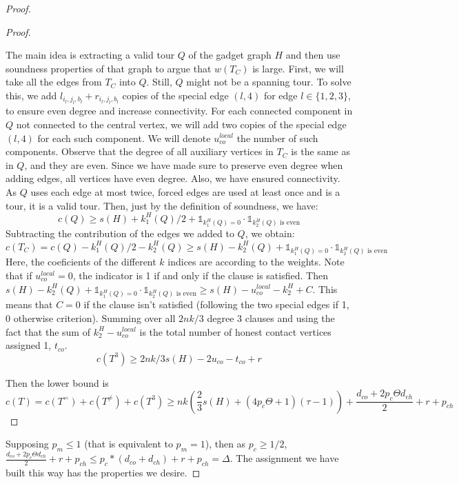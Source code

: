 \documentclass[12pt]{article}
\begin{document}
\begin{proof}
\begin{proof}
\begin{itemize}
        The main idea is extracting a valid tour $Q$ of the gadget graph $H$ and then use soundness properties of that graph to argue that $w(T_C)$ is large. 
        First, we will take all the edges from $T_C$ into $Q$. Still, $Q$ might not be a spanning tour.
        To solve this, we add $l_{i_l,j_l,b_l}+r_{i_l,j_l,b_l}$ copies of the special edge $(l,4)$ for edge $l\in \{1,2,3\}$, to ensure even degree and increase connectivity. For each connected component in $Q$ not connected to the central vertex, we will add two copies of the special edge $(l,4)$ for each such component.
        We will denote $u_{co}^{local}$ the number of such components.
        Observe that the degree of all auxiliary vertices in $T_C$ is the same as in $Q$, and they are even. Since we have made sure to preserve even degree when adding edges, all vertices have even degree. 
        Also, we have ensured connectivity. As $Q$ uses each edge at most twice, forced edges are used at least once and is a tour, it is a valid tour. 
        Then, just by the definition of soundness, we have:
        \[c(Q)\geq s(H)+ k_1^H(Q)/2 + \mathds{1}_{ {k_1^H(Q) = 0}} \cdot \mathds{1}_{ {k_2^H(Q) \text{ is even}} } \]
        Subtracting the contribution of the edges we added to $Q$, we obtain: 
        \[c(T_C)=c(Q)-k_1^H(Q)/2-k_2^H(Q)\geq s(H)-k_2^H(Q)+\mathds{1}_{ {k_1^H(Q) = 0}}\cdot \mathds{1}_{ {k_2^H(Q) \text{ is even}}}\]
        Here, the coeficients of the different $k$ indices are according to the weights. Note that if $u_{co}^{local}=0$, the indicator is 1 if and only if the clause is satisfied. 
        Then $ s(H)-k_2^H(Q)+\mathds{1}_{ {k_1^H(Q) = 0}}\cdot \mathds{1}_{ {k_2^H(Q) \text{ is even}}}\geq s(H)-u_{co}^{local}-k_2^H+C$. 
        This means that $C=0$ if the clause isn't satisfied (following the two special edges if 1, 0 otherwise criterion). 
        Summing over all $2nk/3$ degree 3 clauses and using the fact that the sum of $k_2^H-u_{co}^{local}$ is the total number of honest contact vertices assigned 1, $t_{co}$.
        \[c(T^3)\geq 2nk/3 s(H)-2u_{co}-t_{co}+r\]
    \end{itemize}
    Then the lower bound is
        \[c(T)= c(T^=)+c(T^{\not =})+c(T^3) \geq nk(\frac{2}{3}s(H)+(4p_c\Theta +1) (\tau-1))+ \frac{d_{co}+2p_c\Theta d_{ch}}{2}+r+p_{ch}\]

    \end{proof}
    Supposing $p_m\leq 1$ (that is equivalent to $p_m=1$), then as $p_c\geq 1/2$, $\frac{d_{co}+2p_c\Theta d_{ch}}{2}+r+p_{ch}\leq p_c*(d_{co}+d_{ch})+r+p_{ch}=\Delta$. 
    The assignment we have built this way has the properties we desire. 
\end{proof}
\end{document}
